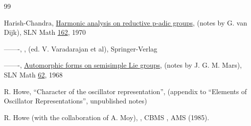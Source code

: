 \documentclass[12pt,letterpaper]{book}
\theoremstyle{plain}
\theoremstyle{definition}
\theoremstyle{remark}
\theoremstyle{remark}
\begin{document}
\begin{thebibliography}{99}




 Harish-Chandra, \underline{Harmonic analysis on
reductive p-adic
groups}, (notes by G. van Dijk), SLN Math \underline{162}, 1970

 -------, , (ed. V. Varadarajan et al), Springer-Verlag

 -------, \underline{Automorphic forms on semisimple
Lie groups}, (notes by J. G. M. Mars), SLN Math \underline{62}, 1968




 R. Howe, ``Character of the oscillator representation'',
(appendix to ``Elements of Oscillator Representations'',
unpublished notes)

 R. Howe (with the collaboration of A. Moy),
\newline
{} 
 , CBMS , AMS (1985).



\end{thebibliography}
\end{document}
